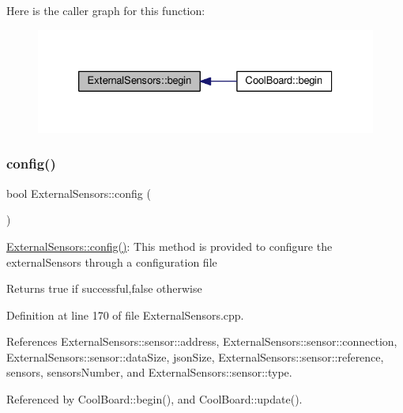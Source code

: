 Here is the caller graph for this function\+:
\nopagebreak
\begin{figure}[H]
\begin{center}
\leavevmode
\includegraphics[width=326pt]{classExternalSensors_a58ede0d786a86417254708870f04a21e_icgraph}
\end{center}
\end{figure}
\mbox{\label{classExternalSensors_a862a4bd11346b37270d0244c2adabe5a}} 
\subsubsection{\texorpdfstring{config()}{config()}}
{\footnotesize\ttfamily bool External\+Sensors\+::config (\begin{DoxyParamCaption}{ }\end{DoxyParamCaption})}

\hyperlink{classExternalSensors_a862a4bd11346b37270d0244c2adabe5a}{External\+Sensors\+::config()}\+: This method is provided to configure the external\+Sensors through a configuration file

\begin{DoxyReturn}{Returns}
true if successful,false otherwise 
\end{DoxyReturn}


Definition at line 170 of file External\+Sensors.\+cpp.



References External\+Sensors\+::sensor\+::address, External\+Sensors\+::sensor\+::connection, External\+Sensors\+::sensor\+::data\+Size, json\+Size, External\+Sensors\+::sensor\+::reference, sensors, sensors\+Number, and External\+Sensors\+::sensor\+::type.



Referenced by Cool\+Board\+::begin(), and Cool\+Board\+::update().


